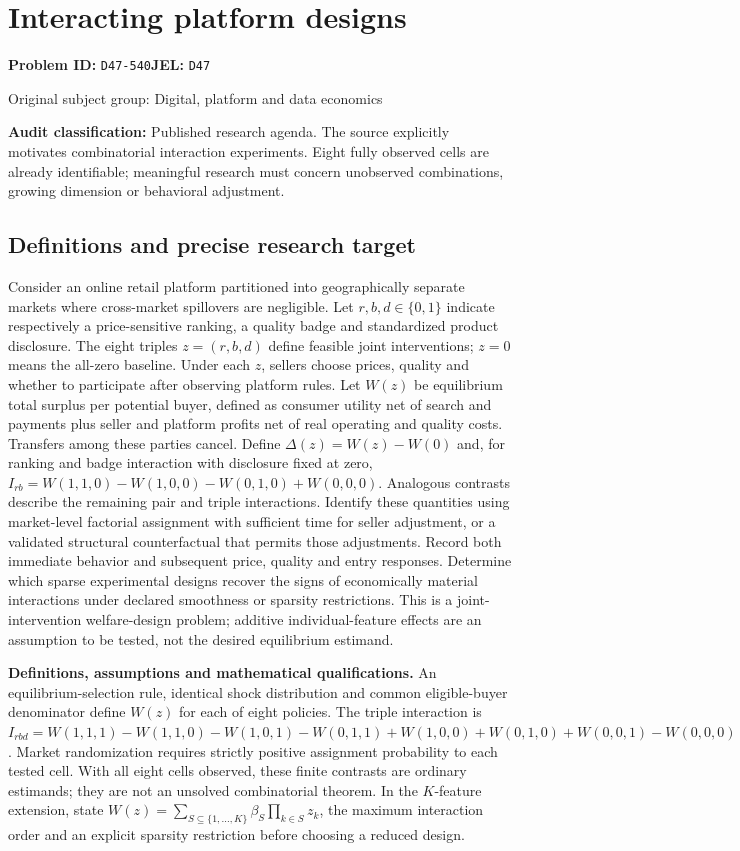 \documentclass[11pt,a4paper]{article}
\begin{document}
\section*{Interacting platform designs}
\textbf{Problem ID:} \texttt{D47-540}\quad \textbf{JEL:} \texttt{D47}\par
\label{problem:OP-0401}
{\sffamily\small\color{muted}Original subject group: Digital, platform and data economics\par}
\label{definitions:problem:30007683}
\textbf{Audit classification:} Published research agenda. The source explicitly motivates combinatorial interaction experiments. Eight fully observed cells are already identifiable; meaningful research must concern unobserved combinations, growing dimension or behavioral adjustment.
\subsection*{Definitions and precise research target}
Consider an online retail platform partitioned into geographically separate markets where cross-market spillovers are negligible. Let \(r,b,d\in\{0,1\}\) indicate respectively a price-sensitive ranking, a quality badge and standardized product disclosure. The eight triples \(z=(r,b,d)\) define feasible joint interventions; \(z=0\) means the all-zero baseline. Under each \(z\), sellers choose prices, quality and whether to participate after observing platform rules. Let \(W(z)\) be equilibrium total surplus per potential buyer, defined as consumer utility net of search and payments plus seller and platform profits net of real operating and quality costs. Transfers among these parties cancel. Define \(\Delta(z)=W(z)-W(0)\) and, for ranking and badge interaction with disclosure fixed at zero, \(I_{rb}=W(1,1,0)-W(1,0,0)-W(0,1,0)+W(0,0,0)\). Analogous contrasts describe the remaining pair and triple interactions. Identify these quantities using market-level factorial assignment with sufficient time for seller adjustment, or a validated structural counterfactual that permits those adjustments. Record both immediate behavior and subsequent price, quality and entry responses. Determine which sparse experimental designs recover the signs of economically material interactions under declared smoothness or sparsity restrictions. This is a joint-intervention welfare-design problem; additive individual-feature effects are an assumption to be tested, not the desired equilibrium estimand.

\textbf{Definitions, assumptions and mathematical qualifications.} An equilibrium-selection rule, identical shock distribution and common eligible-buyer denominator define \(W(z)\) for each of eight policies. The triple interaction is \(I_{rbd}=W(1,1,1)-W(1,1,0)-W(1,0,1)-W(0,1,1)+W(1,0,0)+W(0,1,0)+W(0,0,1)-W(0,0,0)\). Market randomization requires strictly positive assignment probability to each tested cell. With all eight cells observed, these finite contrasts are ordinary estimands; they are not an unsolved combinatorial theorem. In the \(K\)-feature extension, state \(W(z)=\sum_{S\subseteq\{1,\ldots,K\}}\beta_S\prod_{k\in S}z_k\), the maximum interaction order and an explicit sparsity restriction before choosing a reduced design.
\end{document}
